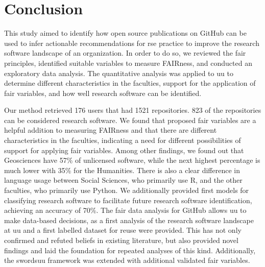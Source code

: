 \chapter{Conclusion}
\label{chap:conclusion}




This study aimed to identify how open source publications on GitHub can be used to infer actionable recommendations for \acrshort{rse} practice to improve the research software landscape of an organization. 
In order to do so, we reviewed the \acrshort{fair} principles, identified suitable variables to measure FAIRness, and conducted an exploratory data analysis.
The quantitative analysis was applied to \acrshort{uu} to determine different characteristics in the faculties, support for the application of \acrshort{fair} variables, and how well research software can be identified. 

Our method retrieved 176 users that had 1521 repositories. 823 of the repositories can be considered research software.
We found that proposed \acrshort{fair} variables are a helpful addition to measuring FAIRness and that there are different characteristics in the faculties, indicating a need for different possibilities of support for applying \acrshort{fair} variables. 
Among other findings, we found out that Geosciences have 57\% of unlicensed software, while the next highest percentage is much lower with 35\% for the Humanities. There is also a clear difference in language usage between Social Sciences, who primarily use R, and the other faculties, who primarily use Python.
We additionally provided first models for classifying research software to facilitate future research software identification, achieving an accuracy of 70\%.
The \acrshort{fair} data analysis for GitHub allows \acrshort{uu} to make data-based decisions, as a first analysis of the research software landscape at \acrshort{uu} and a first labelled dataset for reuse were provided.
This has not only confirmed and refuted beliefs in existing literature, but also provided novel findings and laid the foundation for repeated analyses of this kind.
Additionally, the \acrshort{swordsuu} framework was extended with additional validated  \acrshort{fair} variables. 

